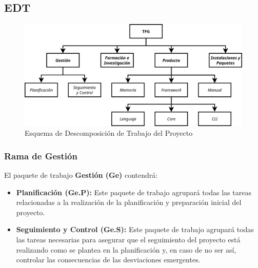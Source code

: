 








\subsection{EDT}\label{subsec:edt}

\begin{figure}[H]
    \centering
    \includegraphics[width=0.85\linewidth]{5-Cuerpo/Chapter2/EDT.png}
    \caption[EDT del Proyecto]{Esquema de Descomposición de Trabajo del Proyecto}\label{fig:EDT}
\end{figure}

\subsubsection{Rama de Gestión}
El paquete de trabajo \textbf{Gestión (Ge)} contendrá:
\begin{itemize}
    \item \textbf{Planificación (Ge.P):} Este paquete de trabajo agrupará todas
    las tareas relacionadas a la realización de la planificación y preparación
    inicial del proyecto.
    \item \textbf{Seguimiento y Control (Ge.S):} Este paquete de trabajo agrupará
    todas las tareas necesarias para asegurar que el seguimiento del proyecto
    está realizando como se plantea en la planificación y, en caso de no ser
    así, controlar las consecuencias de las desviaciones emergentes.
\end{itemize}

